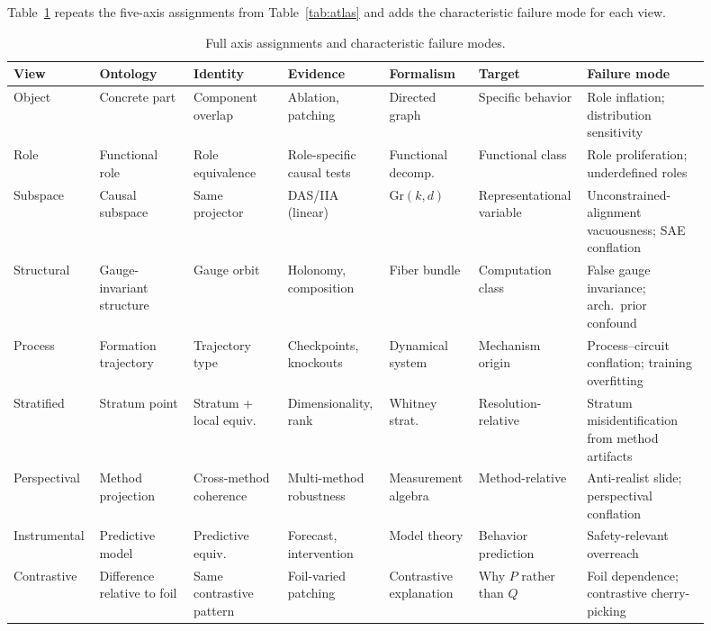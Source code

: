 \documentclass{article}
\newcommand{\Gr}{\mathrm{Gr}}
\begin{document}
Table~\ref{tab:full} repeats the five-axis assignments from
Table~\ref{tab:atlas} and adds the characteristic failure mode for each
view.

\begin{table}[H]
\centering
\footnotesize
\setlength{\tabcolsep}{3pt}
\begin{tabular}{p{0.09\linewidth}p{0.13\linewidth}p{0.13\linewidth}p{0.14\linewidth}p{0.12\linewidth}p{0.12\linewidth}p{0.17\linewidth}}
\toprule
\textbf{View} & \textbf{Ontology}
  & \textbf{Identity} & \textbf{Evidence}
  & \textbf{Formalism} & \textbf{Target}
  & \textbf{Failure mode} \\
\midrule
Object
  & Concrete part
  & Component overlap
  & Ablation, patching
  & Directed graph
  & Specific behavior
  & Role inflation; distribution sensitivity \\[2pt]
Role
  & Functional role
  & Role equivalence
  & Role-specific causal tests
  & Functional decomp.
  & Functional class
  & Role proliferation; underdefined roles \\[2pt]
Subspace
  & Causal subspace
  & Same projector
  & DAS/IIA (linear)
  & $\Gr(k,d)$
  & Representational variable
  & Unconstrained-alignment vacuousness; SAE conflation \\[2pt]
Structural
  & Gauge-invariant structure
  & Gauge orbit
  & Holonomy, composition
  & Fiber bundle
  & Computation class
  & False gauge invariance; arch.\ prior confound \\[2pt]
Process
  & Formation trajectory
  & Trajectory type
  & Checkpoints, knockouts
  & Dynamical system
  & Mechanism origin
  & Process--circuit conflation; training overfitting \\[2pt]
Stratified
  & Stratum point
  & Stratum + local equiv.
  & Dimensionality, rank
  & Whitney strat.
  & Resolution-relative
  & Stratum misidentification from method artifacts \\[2pt]
Perspectival
  & Method projection
  & Cross-method coherence
  & Multi-method robustness
  & Measurement algebra
  & Method-relative
  & Anti-realist slide; perspectival conflation \\[2pt]
Instrumental
  & Predictive model
  & Predictive equiv.
  & Forecast, intervention
  & Model theory
  & Behavior prediction
  & Safety-relevant overreach \\[2pt]
Contrastive
  & Difference relative to foil
  & Same contrastive pattern
  & Foil-varied patching
  & Contrastive explanation
  & Why $P$ rather than $Q$
  & Foil dependence; contrastive cherry-picking \\
\bottomrule
\end{tabular}
\caption{Full axis assignments and characteristic failure modes.}
\label{tab:full}
\end{table}
\end{document}
